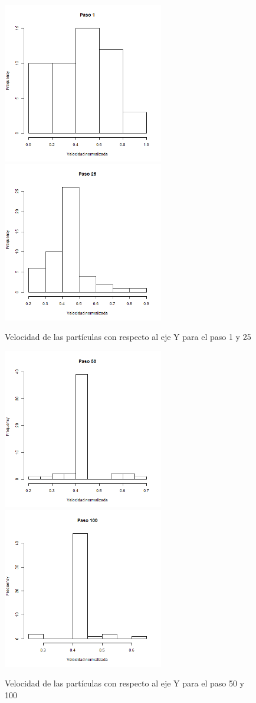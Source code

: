 \documentclass{article}
\begin{document}
\begin{figure}[H]
\centering
\includegraphics[width=7cm]{histy_001.png} \includegraphics[width=7cm]{histy_025.png}
\caption{Velocidad de las partículas con respecto al eje Y para el paso 1 y 25}
\end{figure}
\begin{figure}[H]
\centering
\includegraphics[width=7cm]{histy_050.png} \includegraphics[width=7cm]{histy_100.png}
\caption{Velocidad de las partículas con respecto al eje Y para el paso 50 y 100}
\end{figure}
\end{document}
